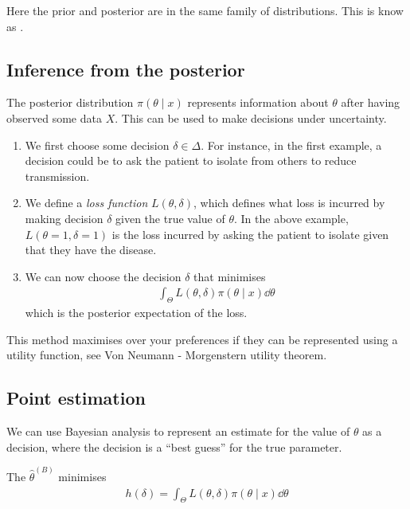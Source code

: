 \begin{note}
	Here the prior and posterior are in the same family of distributions.
	This is know as .
\end{note} 

\subsection{Inference from the posterior}
The posterior distribution $\pi(\theta \mid x)$ represents information about $\theta$ after having observed some data $X$.
This can be used to make decisions under uncertainty.
\begin{enumerate}
	\item We first choose some decision $\delta \in \Delta$.
	      For instance, in the first example, a decision could be to ask the patient to isolate from others to reduce transmission.
	\item We define a \textit{loss function} $L(\theta,\delta)$, which defines what loss is incurred by making decision $\delta$ given the true value of $\theta$.
	      In the above example, $L(\theta = 1, \delta = 1)$ is the loss incurred by asking the patient to isolate given that they have the disease.
	\item We can now choose the decision $\delta$ that minimises
	      \begin{align*}
		      \int_\Theta L(\theta, \delta) \pi(\theta \mid x) \dd{\theta}
	      \end{align*}
	      which is the posterior expectation of the loss.
\end{enumerate}
This method maximises over your preferences if they can be represented using a utility function, see Von Neumann - Morgenstern utility theorem.
\subsection{Point estimation}
We can use Bayesian analysis to represent an estimate for the value of $\theta$ as a decision, where the decision is a ``best guess'' for the true parameter.

\begin{definition}
	The  $\hat \theta^{(B)}$ minimises
	\begin{align*}
		h(\delta) = \int_\Theta L(\theta, \delta) \pi(\theta \mid x) \dd{\theta}
	\end{align*}
\end{definition}

